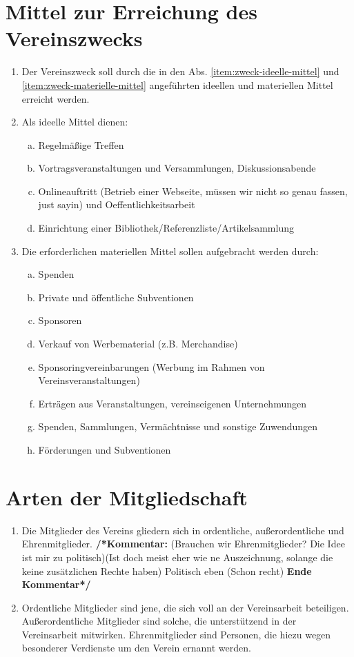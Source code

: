 \documentclass[a4paper,12pt]{article}
\newcommand{\comment}[1]{{\bf /*Kommentar:} #1 {\bf Ende Kommentar*/}}
\begin{document}
\section{Mittel zur Erreichung des Vereinszwecks}%
\label{sec:Mittel}
\begin{enumerate}
\item Der Vereinszweck soll durch die in den Abs. \ref{item:zweck-ideelle-mittel} und \ref{item:zweck-materielle-mittel} angeführten ideellen und materiellen Mittel erreicht werden.
\item\label{item:zweck-ideelle-mittel} Als ideelle Mittel dienen:
\begin{enumerate}[(a)]
\item Regelmäßige Treffen
\item Vortragsveranstaltungen und Versammlungen, Diskussionsabende
\item Onlineauftritt (Betrieb einer Webseite, müssen wir nicht so genau fassen, just sayin) und Oeffentlichkeitsarbeit
\item Einrichtung einer Bibliothek/Referenzliste/Artikelsammlung
\end{enumerate}
\item\label{item:zweck-materielle-mittel} Die erforderlichen materiellen Mittel sollen aufgebracht werden durch:
\begin{enumerate}[(a)]
\item Spenden
\item Private und öffentliche Subventionen
\item Sponsoren
\item Verkauf von Werbematerial (z.B. Merchandise)
\item Sponsoringvereinbarungen (Werbung im Rahmen von Vereinsveranstaltungen)
\item Erträgen aus Veranstaltungen, vereinseigenen Unternehmungen
\item Spenden, Sammlungen, Vermächtnisse und sonstige Zuwendungen
\item Förderungen und Subventionen

\end{enumerate}
\end{enumerate}


\section{Arten der Mitgliedschaft} %
\label{sec:Mitgliedschaft-Arten}
\begin{enumerate}
\item Die Mitglieder des Vereins gliedern sich in ordentliche, außerordentliche und Ehrenmitglieder.
\comment{(Brauchen wir Ehrenmitglieder? Die Idee ist mir zu politisch)(Ist doch meist eher wie ne Auszeichnung, solange die keine zusätzlichen Rechte haben) Politisch eben (Schon recht)}
\item Ordentliche Mitglieder sind jene, die sich voll an der Vereinsarbeit beteiligen. Außerordentliche Mitglieder sind solche, die unterstützend in der Vereinsarbeit mitwirken. Ehrenmitglieder sind Personen, die hiezu wegen besonderer Verdienste um den Verein ernannt werden.
\end{enumerate}
\end{document}
